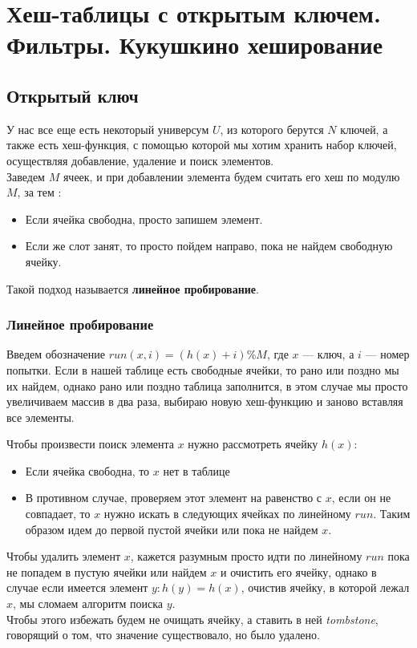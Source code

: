 \section{Хеш-таблицы с открытым ключем. Фильтры. Кукушкино хеширование}%
\label{sec:Хеш-таблицы с открытым ключем. Фильтры. Кукушкино хеширование}
\subsection{Открытый ключ}%
\label{sub:Открытый ключ}

У нас все еще есть некоторый универсум $U$, из которого берутся  $N$ ключей, а также есть хеш-функция, 
с помощью которой мы хотим хранить набор ключей, осуществляя добавление, удаление и поиск элементов. \\

Заведем  $M$ ячеек, и при добавлении элемента будем считать его хеш по модулю  $M$, за тем :
\begin{itemize}
    \item Если ячейка свободна, просто запишем элемент.
    \item Если же слот занят, то просто пойдем направо, пока не найдем свободную ячейку.
\end{itemize}
Такой подход называется \textbf{линейное пробирование}.

\subsubsection{Линейное пробирование}
Введем обозначение $run(x, i) = (h(x) + i) \% M$, где $x$ --- ключ, а  $i$ --- номер попытки. 
Если в нашей таблице есть свободные ячейки, то рано или поздно мы их найдем, однако рано или поздно 
таблица заполнится, в этом случае мы просто увеличиваем массив в два раза, выбираю новую хеш-функцию 
и заново вставляя все элементы. 

Чтобы произвести поиск элемента  $x$ нужно рассмотреть ячейку  $h(x)$:
 \begin{itemize}
    \item Если ячейка свободна, то $x$ нет в таблице
    \item В противном случае, проверяем этот элемент на равенство с $x$, если он не совпадает, 
        то $x$ нужно искать в следующих ячейках по линейному $run$. Таким образом идем до первой пустой ячейки или пока не найдем $x$.
\end{itemize}

Чтобы удалить элемент $x$, кажется разумным просто идти по линейному $run$ пока не попадем в пустую ячейки или найдем $x$ и очистить его ячейку,
однако в случае если имеется элемент $y: h(y) = h(x)$, очистив ячейку, в которой лежал $x$, мы сломаем алгоритм поиска $y$. \\
Чтобы этого избежать будем не очищать ячейку, а ставить в ней \textit{tombstone}, говорящий о том, что значение существовало, но было удалено.

